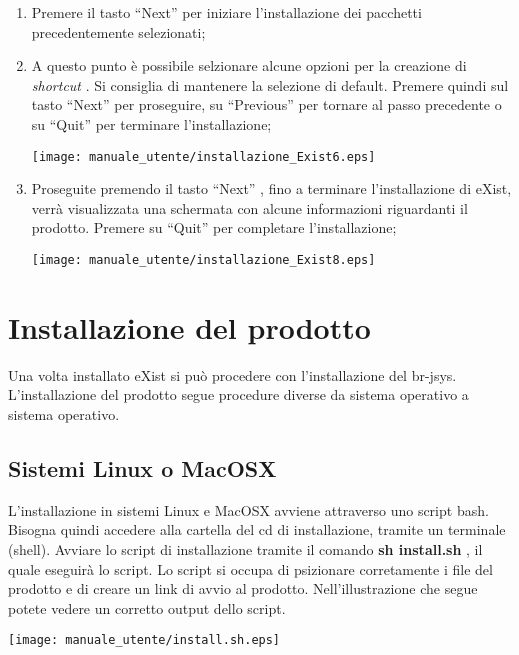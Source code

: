 \begin{enumerate}
\begin{center}
\end{center}
\item Premere il tasto ``Next'' per iniziare l'installazione dei pacchetti precedentemente selezionati;
\item A questo punto \`e possibile selzionare alcune opzioni per la creazione di \textit{shortcut} . Si consiglia di mantenere la selezione di default. Premere quindi sul tasto ``Next'' per proseguire, su ``Previous'' per tornare al passo precedente o su ``Quit'' per terminare l'installazione;
\begin{center}
\texttt{[image: manuale\_utente/installazione\_Exist6.eps]}\\
\end{center}
\item Proseguite premendo il tasto ``Next'' , fino a terminare l'installazione di eXist, verr\`a visualizzata una schermata con alcune informazioni riguardanti il prodotto. Premere su ``Quit'' per completare l'installazione;
\begin{center}
\texttt{[image: manuale\_utente/installazione\_Exist8.eps]}\\
\end{center}
\end{enumerate}

\section{Installazione del prodotto}
Una volta installato eXist si pu\`o procedere con l'installazione del br-jsys.
L'installazione del prodotto segue procedure diverse da sistema operativo a sistema operativo.

\subsection{Sistemi Linux o MacOSX}
L'installazione in sistemi Linux e MacOSX avviene attraverso uno script bash. Bisogna quindi  accedere alla cartella del cd di installazione,  tramite un terminale (shell). Avviare lo script di installazione tramite il comando \textbf{sh install.sh} , il quale eseguir\`a lo script.
Lo script si occupa di psizionare corretamente i file del prodotto e di creare un link di avvio al prodotto.
Nell'illustrazione che segue potete vedere un corretto output dello script.\\
\begin{center}
\texttt{[image: manuale\_utente/install.sh.eps]}\\
\end{center}

